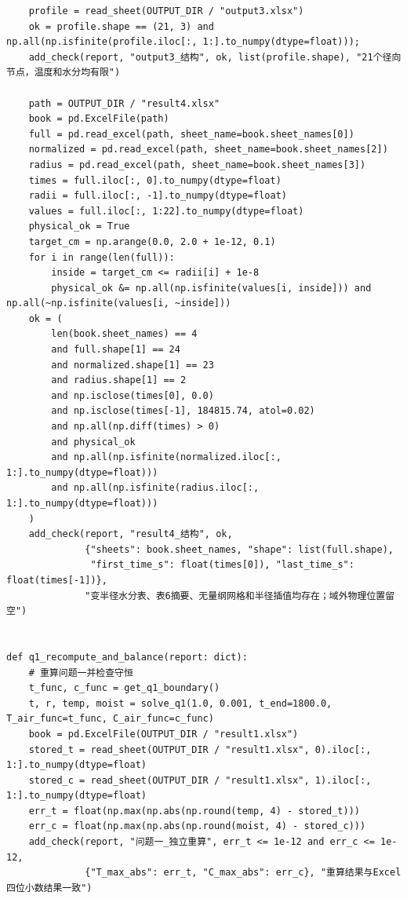 \documentclass[withoutpreface,bwprint]{cumcm_thesis}
\begin{document}
\begin{appendices}
\begin{lstlisting}
    profile = read_sheet(OUTPUT_DIR / "output3.xlsx")
    ok = profile.shape == (21, 3) and np.all(np.isfinite(profile.iloc[:, 1:].to_numpy(dtype=float)));
    add_check(report, "output3_结构", ok, list(profile.shape), "21个径向节点，温度和水分均有限")

    path = OUTPUT_DIR / "result4.xlsx"
    book = pd.ExcelFile(path)
    full = pd.read_excel(path, sheet_name=book.sheet_names[0])
    normalized = pd.read_excel(path, sheet_name=book.sheet_names[2])
    radius = pd.read_excel(path, sheet_name=book.sheet_names[3])
    times = full.iloc[:, 0].to_numpy(dtype=float)
    radii = full.iloc[:, -1].to_numpy(dtype=float)
    values = full.iloc[:, 1:22].to_numpy(dtype=float)
    physical_ok = True
    target_cm = np.arange(0.0, 2.0 + 1e-12, 0.1)
    for i in range(len(full)):
        inside = target_cm <= radii[i] + 1e-8
        physical_ok &= np.all(np.isfinite(values[i, inside])) and np.all(~np.isfinite(values[i, ~inside]))
    ok = (
        len(book.sheet_names) == 4
        and full.shape[1] == 24
        and normalized.shape[1] == 23
        and radius.shape[1] == 2
        and np.isclose(times[0], 0.0)
        and np.isclose(times[-1], 184815.74, atol=0.02)
        and np.all(np.diff(times) > 0)
        and physical_ok
        and np.all(np.isfinite(normalized.iloc[:, 1:].to_numpy(dtype=float)))
        and np.all(np.isfinite(radius.iloc[:, 1:].to_numpy(dtype=float)))
    )
    add_check(report, "result4_结构", ok,
              {"sheets": book.sheet_names, "shape": list(full.shape),
               "first_time_s": float(times[0]), "last_time_s": float(times[-1])},
              "变半径水分表、表6摘要、无量纲网格和半径插值均存在；域外物理位置留空")


def q1_recompute_and_balance(report: dict):
    # 重算问题一并检查守恒
    t_func, c_func = get_q1_boundary()
    t, r, temp, moist = solve_q1(1.0, 0.001, t_end=1800.0, T_air_func=t_func, C_air_func=c_func)
    book = pd.ExcelFile(OUTPUT_DIR / "result1.xlsx")
    stored_t = read_sheet(OUTPUT_DIR / "result1.xlsx", 0).iloc[:, 1:].to_numpy(dtype=float)
    stored_c = read_sheet(OUTPUT_DIR / "result1.xlsx", 1).iloc[:, 1:].to_numpy(dtype=float)
    err_t = float(np.max(np.abs(np.round(temp, 4) - stored_t)))
    err_c = float(np.max(np.abs(np.round(moist, 4) - stored_c)))
    add_check(report, "问题一_独立重算", err_t <= 1e-12 and err_c <= 1e-12,
              {"T_max_abs": err_t, "C_max_abs": err_c}, "重算结果与Excel四位小数结果一致")


\end{lstlisting}
\end{appendices}
\end{document}
